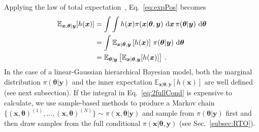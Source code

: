 Applying the law of total expectation~\cite{champ2022generalizedlawtotalcovariance}, Eq.~\eqref{eq:expPos} becomes
\begin{align}
	\mathbb{E}_{\bm{x} ,\bm{\theta}  |\bm{y}} [h(\bm{x})] &= \int \int   h(\bm{x}) \pi(\bm{x} |  \bm{\theta}, \bm{y}) \, \mathop{}\!\mathrm{d} \bm{x} \,  \pi(\bm{\theta} |   \bm{y}) \, \mathop{}\!\mathrm{d} \bm{\theta} \\
	&= \int \mathbb{E}_{\bm{x} |  \bm{\theta}, \bm{y}} \left[ h(\bm{x}) \right] \, \pi(\bm{\theta} |  \bm{y}) \, \mathop{}\!\mathrm{d} \bm{\theta}\label{eq:2fullCond} \\
		&= \mathbb{E}_{\bm{\theta} |  \bm{y}} \left[ \mathbb{E}_{\bm{x} |  \bm{\theta}, \bm{y}} [h(\bm{x})] \right] \, .
	\label{eq:fullCond}
\end{align}
In the case of a linear-Gaussian hierarchical Bayesian model, both the marginal distribution $\pi (\bm{\theta}| \bm{y})$ %
and the inner expectation $\mathbb{E}_{\bm{x} |  \bm{\theta}, \bm{y}} \left[ h(\bm{x}) \right]$ are well defined (see next subsection).
If the integral in Eq.~\ref{eq:2fullCond} is expensive to calculate, we use sample-based methods to produce a Markov chain $\{ (\bm{x}, \bm{\theta})^{(1)}, \dots, (\bm{x}, \bm{\theta})^{(N)} \} \sim \pi(\bm{x}, \bm{\theta} |  \bm{y}) $ and sample from $\pi(\bm{\theta} |  \bm{y})$ first and then draw samples from the full conditional $\pi(\bm{x} | \bm{\theta} , \bm{y})$ (see Sec.~\ref{subsec:RTO}). 
~\cite{fox2016fast}



